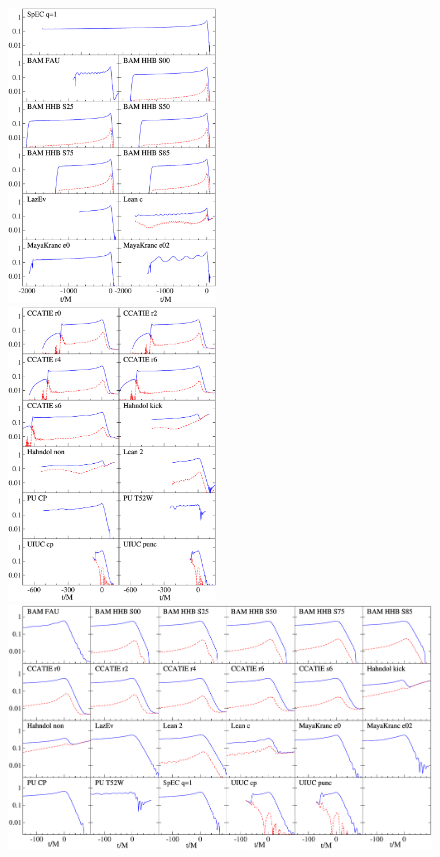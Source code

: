 \begin{figure}
\includegraphics[width=0.49\textwidth]{figures/ninja1/Prune_SumAllModes-A}
$\;$
\includegraphics[width=0.49\textwidth]{figures/ninja1/Prune_SumAllModes-B}\\[-0.25em]

\includegraphics[width=\textwidth]{figures/ninja1/Prune_SumAllModes-Merger}


\end{figure}
